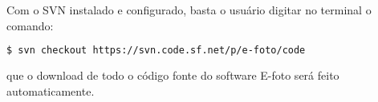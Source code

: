  Com o SVN instalado e configurado, basta o usuário digitar no terminal o comando:
 \begin{lstlisting}[language=bash]
 $ svn checkout https://svn.code.sf.net/p/e-foto/code
 \end{lstlisting}
 que o download de todo o código fonte do software E-foto será feito automaticamente.  %
    
    
